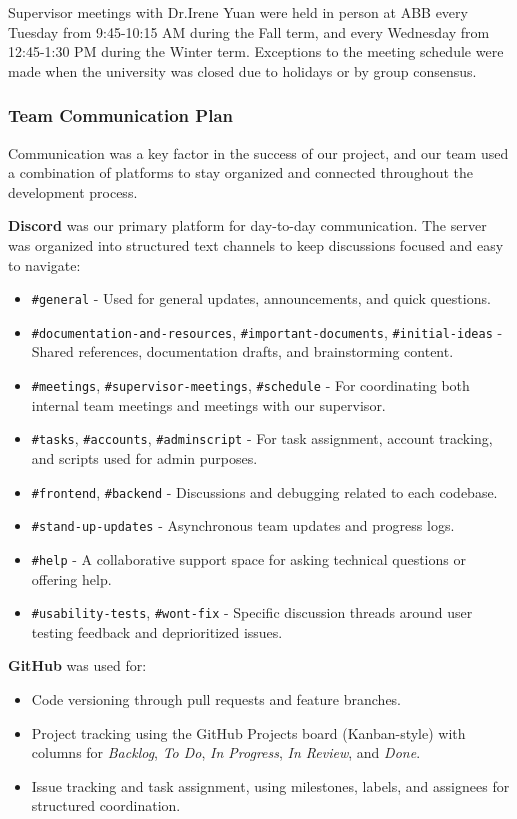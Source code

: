 \documentclass{article}
\begin{document}
Supervisor meetings with Dr.Irene Yuan were held in person at ABB every Tuesday from 9:45-10:15 AM during the Fall term, and every Wednesday from 12:45-1:30 PM during the Winter term. Exceptions to the meeting schedule were made when the university was closed due to holidays or by group consensus.

\subsubsection{Team Communication Plan}

\hspace{2em}Communication was a key factor in the success of our project, and our team used a combination of platforms to stay organized and connected throughout the development process.

\textbf{Discord} was our primary platform for day-to-day communication. The server was organized into structured text channels to keep discussions focused and easy to navigate:
\begin{itemize}
    \item \texttt{\#general} - Used for general updates, announcements, and quick questions.
    \item \texttt{\#documentation-and-resources}, \texttt{\#important-documents}, 
    \texttt{\#initial-ideas} - Shared references, documentation drafts, and brainstorming content.
    \item \texttt{\#meetings}, \texttt{\#supervisor-meetings}, \texttt{\#schedule} 
    - For coordinating both internal team meetings and meetings with our supervisor.
    \item \texttt{\#tasks}, \texttt{\#accounts}, \texttt{\#adminscript} 
    - For task assignment, account tracking, and scripts used for admin purposes.
    \item \texttt{\#frontend}, \texttt{\#backend} 
    - Discussions and debugging related to each codebase.
    \item \texttt{\#stand-up-updates} - Asynchronous team updates and progress logs.
    \item \texttt{\#help} - A collaborative support space for asking technical questions or offering help.
    \item \texttt{\#usability-tests}, \texttt{\#wont-fix} - Specific discussion threads around user testing feedback and deprioritized issues.
\end{itemize}

\textbf{GitHub} was used for:
\begin{itemize}
    \item Code versioning through pull requests and feature branches.
    \item Project tracking using the GitHub Projects board (Kanban-style) with columns for \textit{Backlog}, \textit{To Do}, \textit{In Progress}, \textit{In Review}, and \textit{Done}.
    \item Issue tracking and task assignment, using milestones, labels, and assignees for structured coordination.
\end{itemize}
\end{document}
